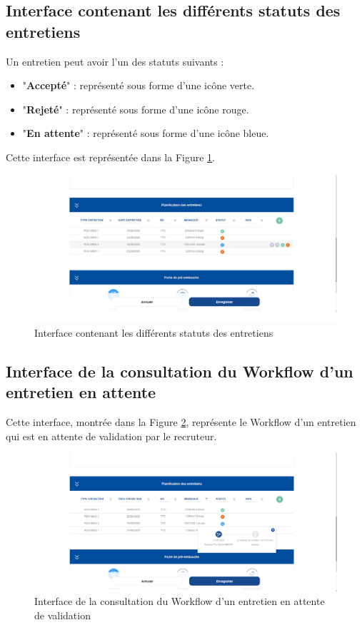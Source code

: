 \subsection{Interface contenant les différents statuts des entretiens}
Un entretien peut avoir l'un des statuts suivants :
\begin{itemize}
    \item "\textbf{Accepté}" : représenté sous forme d'une icône verte.
    \item "\textbf{Rejeté}" : représenté sous forme d'une icône rouge.
    \item "\textbf{En attente}" : représenté sous forme d'une icône bleue.
\end{itemize}
Cette interface est représentée dans la Figure \ref{fig:capture_liste_entretien}.
\begin{figure}[H]
     \centering
     \includegraphics[scale=0.5]{img/cpature liste entretien.png}
     \caption{Interface contenant les différents statuts des entretiens}
     \label{fig:capture_liste_entretien}
 \end{figure}
\subsection{Interface de la consultation du Workflow d'un entretien en attente}
Cette interface, montrée dans la Figure \ref{fig:capture_entretien_en_attente}, représente le Workflow d'un entretien qui est en attente de validation par le recruteur.
\begin{figure}[H]
     \centering
     \includegraphics[scale=0.5]{img/capture entretien statut en attente.png}
     \caption{Interface de la consultation du Workflow d'un entretien en attente de validation}
     \label{fig:capture_entretien_en_attente}
 \end{figure}
